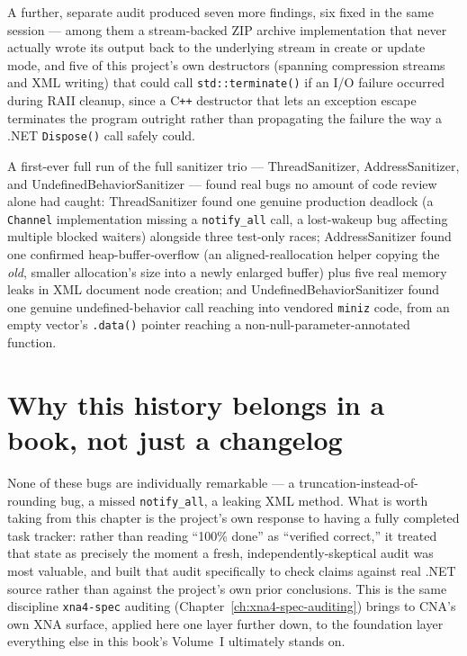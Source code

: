 A further, separate audit produced seven more findings, six fixed in the same session ---
among them a stream-backed ZIP archive implementation that never actually wrote its output
back to the underlying stream in create or update mode, and five of this project's own
destructors (spanning compression streams and XML writing) that could call
\texttt{std::terminate()} if an I/O failure occurred during RAII cleanup, since a
C\texttt{++} destructor that lets an exception escape terminates the program outright rather
than propagating the failure the way a .NET \texttt{Dispose()} call safely could.

A first-ever full run of the full sanitizer trio --- ThreadSanitizer, AddressSanitizer, and
UndefinedBehaviorSanitizer --- found real bugs no amount of code review alone had caught:
ThreadSanitizer found one genuine production deadlock (a \texttt{Channel} implementation
missing a \texttt{notify\_all} call, a lost-wakeup bug affecting multiple blocked waiters)
alongside three test-only races; AddressSanitizer found one confirmed heap-buffer-overflow (an
aligned-reallocation helper copying the \emph{old}, smaller allocation's size into a newly
enlarged buffer) plus five real memory leaks in XML document node creation; and
UndefinedBehaviorSanitizer found one genuine undefined-behavior call reaching into vendored
\texttt{miniz} code, from an empty vector's \texttt{.data()} pointer reaching a
non-null-parameter-annotated function.

\section{Why this history belongs in a book, not just a changelog}

None of these bugs are individually remarkable --- a truncation-instead-of-rounding bug, a
missed \texttt{notify\_all}, a leaking XML method. What is worth taking from this chapter is
the project's own response to having a fully completed task tracker: rather than reading
``100\% done'' as ``verified correct,'' it treated that state as precisely the moment a fresh,
independently-skeptical audit was most valuable, and built that audit specifically to check
claims against real .NET source rather than against the project's own prior conclusions. This
is the same discipline \texttt{xna4-spec} auditing (Chapter~\ref{ch:xna4-spec-auditing})
brings to CNA's own XNA surface, applied here one layer further down, to the foundation layer
everything else in this book's Volume~I ultimately stands on.
